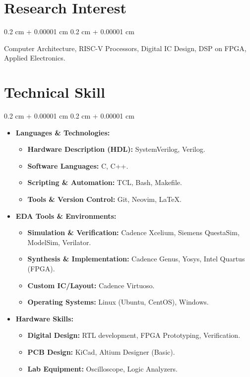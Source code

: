 \documentclass[11pt, letterpaper]{article}
\newenvironment{highlights}{
	\begin{itemize}[
		topsep=0.10 cm,
		parsep=0.10 cm,
		partopsep=0pt,
		itemsep=0pt,
		leftmargin=0.4 cm + 10pt
		]
	}{
	\end{itemize}
} %
\newenvironment{onecolentry}{
	\begin{adjustwidth}{
			0.2 cm + 0.00001 cm
		}{
			0.2 cm + 0.00001 cm
		}
	}{
	\end{adjustwidth}
} %
\begin{document}
	
	\section{Research Interest}
		
	\begin{onecolentry}
		Computer Architecture, RISC-V Processors, Digital IC Design, DSP on FPGA, Applied Electronics.
	\end{onecolentry}
	
	\section{Technical Skill}
	
	\vspace{0.10 cm}
	\begin{onecolentry}
		\begin{highlights}
			\item \textbf{Languages \& Technologies:}
				\begin{itemize}[label=+]
					\item \textbf{Hardware Description (HDL):} SystemVerilog, Verilog.
					\item \textbf{Software Languages:} C, C++.
					\item \textbf{Scripting \& Automation:} TCL, Bash, Makefile.
					\item \textbf{Tools \& Version Control:} Git, Neovim, \LaTeX.
				\end{itemize}
			\item \textbf{EDA Tools \& Environments:}
				\begin{itemize}[label=+]
					\item \textbf{Simulation \& Verification:} Cadence Xcelium, Siemens QuestaSim, ModelSim, Verilator.
					\item \textbf{Synthesis \& Implementation:} Cadence Genus, Yosys, Intel Quartus (FPGA).
					\item \textbf{Custom IC/Layout:} Cadence Virtuoso.
					\item \textbf{Operating Systems:} Linux (Ubuntu, CentOS), Windows.
				\end{itemize}
			\item \textbf{Hardware Skills:}
				\begin{itemize}[label=+]
					\item \textbf{Digital Design:} RTL development, FPGA Prototyping, Verification.
					\item \textbf{PCB Design:} KiCad, Altium Designer (Basic).
					\item \textbf{Lab Equipment:} Oscilloscope, Logic Analyzers.
				\end{itemize}
		\end{highlights}
	\end{onecolentry}
	
\end{document}
